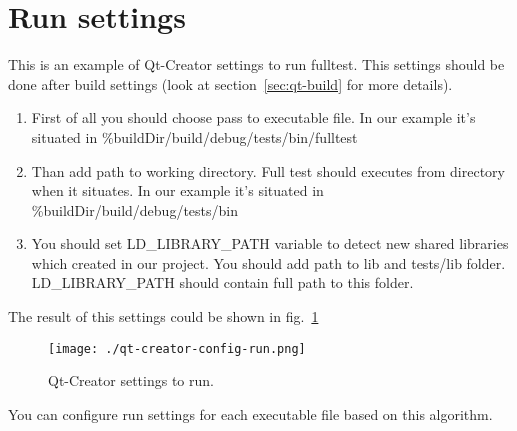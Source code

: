 \section{Run settings}

This is an example of Qt-Creator settings to run fulltest. This settings should be done after build settings (look at section~\ref{sec:qt-build} for more details).

\begin{enumerate}
  \item First of all you should choose pass to executable file. In our example it's situated in \%{buildDir}/build/debug/tests/bin/fulltest
  \item Than add path to working directory. Full test should executes from directory when it situates. In our example it's situated in \%{buildDir}/build/debug/tests/bin
  \item You should set LD\_LIBRARY\_PATH variable to detect new shared libraries which created in our project. You should add path to lib and tests/lib folder. LD\_LIBRARY\_PATH should contain full path to this folder.
\end{enumerate}

The result of this settings could be shown in fig.~\ref{fig:qt-creator-config-run}

\begin{figure}[ht]
  \centering
  \texttt{[image: ./qt-creator-config-run.png]}
  \caption{Qt-Creator settings to run.}
  \label{fig:qt-creator-config-run}
\end{figure}

You can configure run settings for each executable file based on this algorithm.

\printindex


